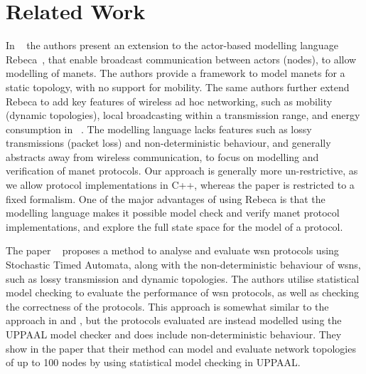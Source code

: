 \section{Related Work}\label{sec:relatedworks}



In ~\cite{DBLP:conf/fsen/YousefiGK15}
the authors present an extension to the actor-based modelling language Rebeca~\cite{Sirjani2004ModelingAV},
that enable broadcast communication between actors (nodes), to allow modelling of \gls{manet}s. The
authors provide a framework to model \gls{manet}s for a static topology, with no support for mobility. The
same authors further extend Rebeca to add key features of wireless ad hoc networking, such as mobility
(dynamic topologies), local broadcasting within a transmission range, and energy consumption in
~\cite{DBLP:journals/fac/YousefiGK17}. The modelling language lacks features such as lossy
transmissions (packet loss) and non-deterministic behaviour, and generally abstracts away from wireless
communication, to focus on modelling and verification of \gls{manet} protocols. Our approach is
generally more un-restrictive, as we allow protocol implementations in C++, whereas the paper is restricted to
a fixed formalism. One of the major advantages of using Rebeca is that the modelling language makes it
possible model check and verify \gls{manet} protocol implementations, and explore the full state space for the
model of a protocol.\medbreak

The paper ~\cite{article:maeofwsnpbsta} proposes a method to analyse and evaluate \gls{wsn} protocols using
Stochastic Timed Automata, along with the non-deterministic behaviour of \gls{wsn}s, such as lossy
transmission and dynamic topologies. The authors utilise statistical model checking to evaluate the
performance of \gls{wsn} protocols, as well as checking the correctness of the protocols. This approach is
somewhat similar to the approach in \cite{DBLP:conf/fsen/YousefiGK15} and
\cite{DBLP:journals/fac/YousefiGK17}, but the protocols evaluated are instead modelled using the UPPAAL model
checker and does include non-deterministic behaviour. They show in the paper that their method can
model and evaluate network topologies of up to 100 nodes by using statistical model checking in UPPAAL.
\medbreak

